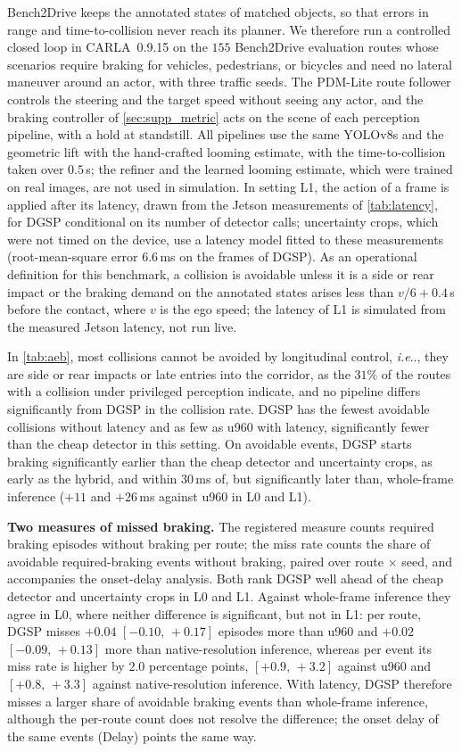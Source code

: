 \documentclass[10pt,letterpaper]{article}
\makeatletter
\DeclareRobustCommand\onedot{\futurelet\@let@token\@onedot}
\def\@onedot{\ifx\@let@token.\else.\null\fi\xspace}
\def\ie{\emph{i.e}\onedot} \def\Ie{\emph{I.e}\onedot}
\newcommand{\method}{DGSP\xspace}
\newcommand{\ci}[2]{[#1,\allowbreak\,#2]}
\theoremstyle{remark}
\theoremstyle{plain}
\theoremstyle{definition}
\makeatother
\begin{document}
Bench2Drive keeps the annotated states of matched objects, so that errors in range and time-to-collision never reach its planner.
We therefore run a controlled closed loop in CARLA~0.9.15 on the $155$ Bench2Drive evaluation routes whose scenarios require braking for vehicles, pedestrians, or bicycles and need no lateral maneuver around an actor, with three traffic seeds.
The PDM-Lite route follower controls the steering and the target speed without seeing any actor, and the braking controller of \cref{sec:supp_metric} acts on the scene of each perception pipeline, with a hold at standstill.
All pipelines use the same YOLOv8s and the geometric lift with the hand-crafted looming estimate, with the time-to-collision taken over $0.5$\,s; the refiner and the learned looming estimate, which were trained on real images, are not used in simulation.
In setting L1, the action of a frame is applied after its latency, drawn from the Jetson measurements of \cref{tab:latency}, for \method conditional on its number of detector calls; uncertainty crops, which were not timed on the device, use a latency model fitted to these measurements (root-mean-square error $6.6$\,ms on the frames of \method).
As an operational definition for this benchmark, a collision is avoidable unless it is a side or rear impact or the braking demand on the annotated states arises less than $v/6+0.4$\,s before the contact, where $v$ is the ego speed; the latency of L1 is simulated from the measured Jetson latency, not run live.

In \cref{tab:aeb}, most collisions cannot be avoided by longitudinal control, \ie, they are side or rear impacts or late entries into the corridor, as the $31\%$ of the routes with a collision under privileged perception indicate, and no pipeline differs significantly from \method in the collision rate.
\method has the fewest avoidable collisions without latency and as few as u960 with latency, significantly fewer than the cheap detector in this setting.
On avoidable events, \method starts braking significantly earlier than the cheap detector and uncertainty crops, as early as the hybrid, and within $30$\,ms of, but significantly later than, whole-frame inference ($+11$ and $+26$\,ms against u960 in L0 and L1).

\noindent\textbf{Two measures of missed braking.}
The registered measure counts required braking episodes without braking per route; the miss rate counts the share of avoidable required-braking events without braking, paired over route $\times$ seed, and accompanies the onset-delay analysis.
Both rank \method well ahead of the cheap detector and uncertainty crops in L0 and L1.
Against whole-frame inference they agree in L0, where neither difference is significant, but not in L1: per route, \method misses $+0.04$ $\ci{-0.10}{+0.17}$ episodes more than u960 and $+0.02$ $\ci{-0.09}{+0.13}$ more than native-resolution inference, whereas per event its miss rate is higher by $2.0$ percentage points, $\ci{+0.9}{+3.2}$ against u960 and $\ci{+0.8}{+3.3}$ against native-resolution inference.
With latency, \method therefore misses a larger share of avoidable braking events than whole-frame inference, although the per-route count does not resolve the difference; the onset delay of the same events (Delay) points the same way.
\end{document}
